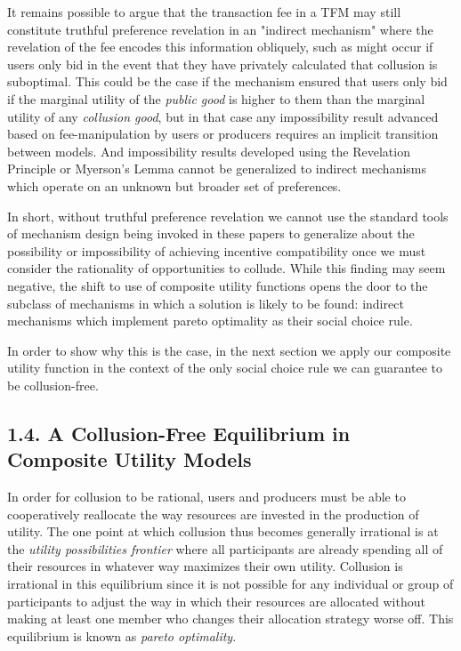 \documentclass[oneside]{article}   	%
\begin{document}
It remains possible to argue that the transaction fee in a TFM may still constitute truthful preference revelation in an "indirect mechanism" where the revelation of the fee encodes this information obliquely, such as might occur if users only bid in the event that they have privately calculated that collusion is suboptimal. This could be the case if the mechanism ensured that users only bid if the marginal utility of the \textit{public good} is higher to them than the marginal utility of any \textit{collusion good}, but in that case any impossibility result advanced based on fee-manipulation by users or producers requires an implicit transition between models. And impossibility results developed using the Revelation Principle or Myerson's Lemma cannot be generalized to indirect mechanisms which operate on an unknown but broader set of preferences.

In short, without truthful preference revelation we cannot use the standard tools of mechanism design being invoked in these papers to generalize about the possibility or impossibility of achieving incentive compatibility once we must consider the rationality of opportunities to collude. While this finding may seem negative, the shift to use of composite utility functions opens the door to the subclass of mechanisms in which a solution is likely to be found: indirect mechanisms which implement pareto optimality as their social choice rule.

In order to show why this is the case, in the next section we apply our composite utility function in the context of the only social choice rule we can guarantee to be collusion-free.


\subsection*{1.4. A Collusion-Free Equilibrium in Composite Utility Models}

In order for collusion to be rational, users and producers must be able to cooperatively reallocate the way resources are invested in the production of utility. The one point at which collusion thus becomes generally irrational is at the \textit{utility possibilities frontier} where all participants are already spending all of their resources in whatever way maximizes their own utility. Collusion is irrational in this equilibrium since it is not possible for any individual or group of participants to adjust the way in which their resources are allocated without making at least one member who changes their allocation strategy worse off. This equilibrium is known as \textit{pareto optimality}.
\end{document}
